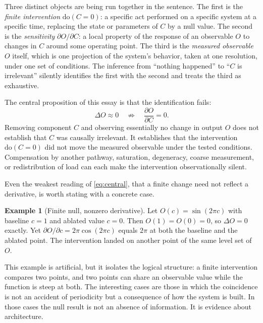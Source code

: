 \documentclass[11pt]{article}
\theoremstyle{definition}
\newtheorem{example}[theorem]{Example}
\theoremstyle{remark}
\newcommand{\dox}[1]{\mathrm{do}(#1)}
\begin{document}
Three distinct objects are being run together in the sentence. The first is the \emph{finite intervention} $\dox{C=0}$: a specific act performed on a specific system at a specific time, replacing the state or parameters of $C$ by a null value. The second is the \emph{sensitivity} $\partial O/\partial C$: a local property of the response of an observable $O$ to changes in $C$ around some operating point. The third is the \emph{measured observable} $O$ itself, which is one projection of the system's behavior, taken at one resolution, under one set of conditions. The inference from ``nothing happened'' to ``$C$ is irrelevant'' silently identifies the first with the second and treats the third as exhaustive.

The central proposition of this essay is that the identification fails:
\begin{equation}\label{eq:central}
\Delta O \approx 0 \quad\not\Rightarrow\quad \frac{\partial O}{\partial C}=0 .
\end{equation}
Removing component $C$ and observing essentially no change in output $O$ does not establish that $C$ was causally irrelevant. It establishes that the intervention $\dox{C=0}$ did not move the measured observable under the tested conditions. Compensation by another pathway, saturation, degeneracy, coarse measurement, or redistribution of load can each make the intervention observationally silent.

Even the weakest reading of \eqref{eq:central}, that a finite change need not reflect a derivative, is worth stating with a concrete case.

\begin{example}[Finite null, nonzero derivative]\label{ex:sin}
Let $O(c)=\sin(2\pi c)$ with baseline $c=1$ and ablated value $c=0$. Then $O(1)=O(0)=0$, so $\Delta O=0$ exactly. Yet $\partial O/\partial c=2\pi\cos(2\pi c)$ equals $2\pi$ at both the baseline and the ablated point. The intervention landed on another point of the same level set of $O$.
\end{example}

This example is artificial, but it isolates the logical structure: a finite intervention compares two points, and two points can share an observable value while the function is steep at both. The interesting cases are those in which the coincidence is not an accident of periodicity but a consequence of how the system is built. In those cases the null result is not an absence of information. It is evidence about architecture.
\end{document}
